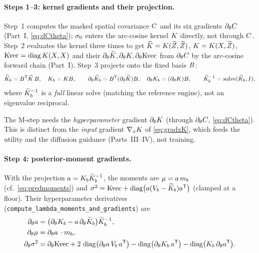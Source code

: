 \paragraph{Steps 1--3: kernel gradients and their projection.}
Step~1 computes the masked spatial covariance $C$ and its six gradients
$\partial_\theta C$ (Part~I, \eqref{eq:dCtheta}); $\sigma_{0}$ enters the
arc-cosine kernel $K$ directly, not through $C$. Step~2 evaluates the
kernel three times to get $\widetilde{K}=K(\widetilde{Z},\widetilde{Z})$, $K=K(X,\widetilde{Z})$,
$\mathrm{Kvec}=\operatorname{diag}K(X,X)$ and their $\partial_\theta\widetilde{K},\partial_\theta K,
\partial_\theta\mathrm{Kvec}$ from $\partial_\theta C$ by the arc-cosine forward chain
(Part~I). Step~3 projects onto the fixed basis $B$:
\begin{equation}
\widetilde{K}_{b}=B^{\mathsf{T}}\widetilde{K}\,B,\quad K_b=KB,\qquad
\partial_\theta\widetilde{K}_{b}=B^{\mathsf{T}}(\partial_\theta\widetilde{K})B,\quad
\partial_\theta K_b=(\partial_\theta K)B,\qquad
\widetilde{K}_{b}^{-1}=\operatorname{solve}(\widetilde{K}_{b},I),
\end{equation}
where $\widetilde{K}_{b}^{-1}$ is a \emph{full} linear solve (matching the reference
engine), not an eigenvalue reciprocal.

\begin{remark}
The M-step needs the \emph{hyperparameter} gradient $\partial_\theta K$ (through
$\partial_\theta C$, \eqref{eq:dCtheta}). This is distinct from the
\emph{input} gradient $\nabla_xK$ of \eqref{eq:gradxK}, which feeds the utility
and the diffusion guidance (Parts~III--IV), not training.
\end{remark}

\paragraph{Step 4: posterior-moment gradients.}
With the projection $a=K_b\widetilde{K}_{b}^{-1}$, the moments are
$\mu=a\,m_{b}$ (cf.\ \eqref{eq:predmoments}) and
$\sigma^{2}=\mathrm{Kvec}+\operatorname{diag}\!\big(a(V_{b}-\widetilde{K}_{b})a^{\mathsf{T}}\big)$ (clamped at a
floor). Their hyperparameter derivatives
(\texttt{compute\_lambda\_moments\_and\_gradients}) are
\begin{align}
\partial_\theta a &= \big(\partial_\theta K_b-a\,\partial_\theta\widetilde{K}_{b}\big)\widetilde{K}_{b}^{-1},\\
\partial_\theta\mu &= \partial_\theta a\,\cdot m_{b},\\
\partial_\theta\sigma^{2} &= \partial_\theta\mathrm{Kvec}
   + 2\,\operatorname{diag}\!\big(\partial_\theta a\,V_{b}\,a^{\mathsf{T}}\big)
   - \operatorname{diag}\!\big(\partial_\theta K_b\,a^{\mathsf{T}}\big)
   - \operatorname{diag}\!\big(K_b\,\partial_\theta a^{\mathsf{T}}\big).
\end{align}

